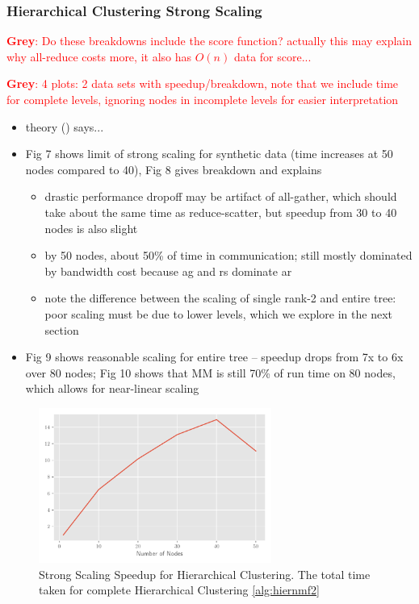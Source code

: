 \documentclass[conference,compsoc]{IEEEtran}
\newcommand{\GB}[1]{\textcolor{red}{\textbf{Grey}: #1}}
\begin{document}
\subsubsection{Hierarchical Clustering Strong Scaling}

\GB{Do these breakdowns include the score function?  actually this may explain why all-reduce costs more, it also has $O(n)$ data for score...}

\GB{4 plots: 2 data sets with speedup/breakdown, note that we include time for complete levels, ignoring nodes in incomplete levels for easier interpretation}

\begin{itemize}
	\item theory () says...
	\item Fig 7 shows limit of strong scaling for synthetic data (time increases at 50 nodes compared to 40), Fig 8 gives breakdown and explains
	\begin{itemize}
		\item drastic performance dropoff may be artifact of all-gather, which should take about the same time as reduce-scatter, but speedup from 30 to 40 nodes is also slight
		\item by 50 nodes, about 50\% of time in communication; still mostly dominated by bandwidth cost because ag and rs dominate ar
		\item note the difference between the scaling of single rank-2 and entire tree: poor scaling must be due to lower levels, which we explore in the next section
	\end{itemize}
	\item Fig 9 shows reasonable scaling for entire tree -- speedup drops from 7x to 6x over 80 nodes; Fig 10 shows that MM is still 70\% of run time on 80 nodes, which allows for near-linear scaling
\end{itemize}

\begin{figure}
\begin{center}
\includegraphics[height=2in, width=\columnwidth]{plots/synthetic_hierarchical_speedup.pdf}
\caption{Strong Scaling Speedup for Hierarchical Clustering. The total time taken for complete Hierarchical Clustering \cref{alg:hiernmf2}}
\label{fig:synhierspeedup}
\end{center}
\end{figure}
\end{document}
